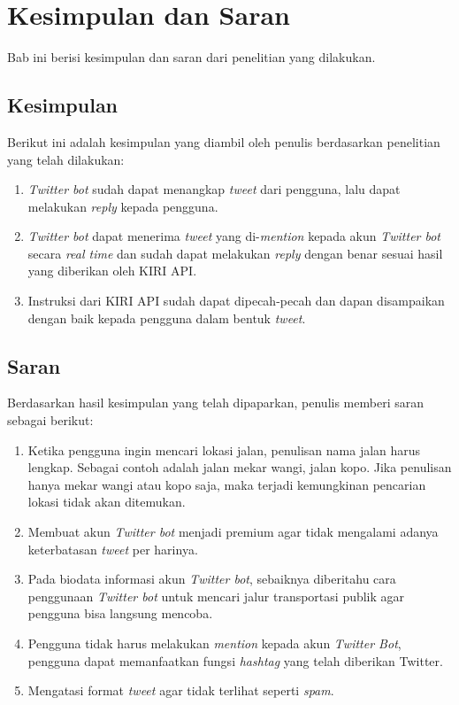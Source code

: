 \chapter{Kesimpulan dan Saran}
\label{chap:kesimpulan dan saran}

Bab ini berisi kesimpulan dan saran dari penelitian yang dilakukan.

\section{Kesimpulan}
Berikut ini adalah kesimpulan yang diambil oleh penulis berdasarkan penelitian yang telah dilakukan:

\begin{enumerate}
	\item \textit{Twitter bot} sudah dapat menangkap \textit{tweet} dari pengguna, lalu dapat melakukan \textit{reply} kepada pengguna.
	\item \textit{Twitter bot} dapat menerima \textit{tweet} yang di-\textit{mention} kepada akun \textit{Twitter bot} secara \textit{real time} dan sudah dapat melakukan \textit{reply} dengan benar sesuai hasil yang diberikan oleh KIRI API.
	\item Instruksi dari KIRI API sudah dapat dipecah-pecah dan dapan disampaikan dengan baik kepada pengguna dalam bentuk \textit{tweet}.
\end{enumerate}

\section{Saran}
Berdasarkan hasil kesimpulan yang telah dipaparkan, penulis memberi saran sebagai berikut:

\begin{enumerate}
	\item Ketika pengguna ingin mencari lokasi jalan, penulisan nama jalan harus lengkap. Sebagai contoh adalah jalan mekar wangi, jalan kopo. Jika penulisan hanya mekar wangi atau kopo saja, maka terjadi kemungkinan pencarian lokasi tidak akan ditemukan.
	\item Membuat akun \textit{Twitter bot} menjadi premium agar tidak mengalami adanya keterbatasan \textit{tweet} per harinya.
	\item Pada biodata informasi akun \textit{Twitter bot}, sebaiknya diberitahu cara penggunaan \textit{Twitter bot} untuk mencari jalur transportasi publik agar pengguna bisa langsung mencoba.
	\item Pengguna tidak harus melakukan \textit{mention} kepada akun \textit{Twitter Bot}, pengguna dapat memanfaatkan fungsi \textit{hashtag} yang telah diberikan Twitter.
	\item Mengatasi format \textit{tweet} agar tidak terlihat seperti \textit{spam}.
\end{enumerate}